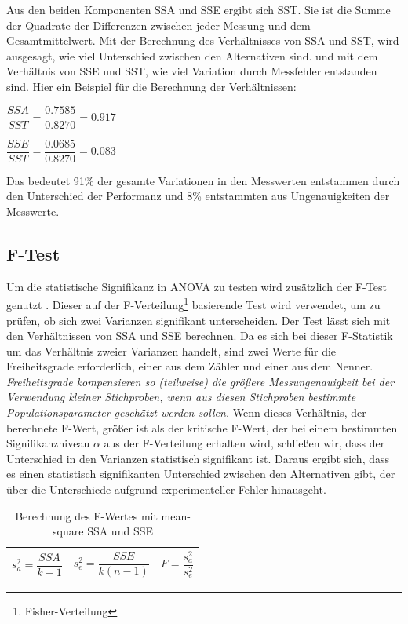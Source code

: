 Aus den beiden Komponenten SSA und SSE ergibt sich SST.
Sie ist die Summe der Quadrate der Differenzen zwischen jeder Messung und dem Gesamtmittelwert.
Mit der Berechnung des Verhältnisses von SSA und SST, wird ausgesagt, wie viel Unterschied zwischen den Alternativen sind.
und mit dem Verhältnis von SSE und SST, wie viel Variation durch Messfehler entstanden sind.  
Hier ein Beispiel für die Berechnung der Verhältnissen:

\begin{center}
  $\dfrac{SSA}{SST} = \dfrac{0.7585}{0.8270} = 0.917$
\end{center}

\begin{center}
  $\dfrac{SSE}{SST} = \dfrac{0.0685}{0.8270} = 0.083$
\end{center}

Das bedeutet 91\% der gesamte Variationen in den Messwerten entstammen durch den Unterschied der Performanz und
8\% entstammten aus Ungenauigkeiten der Messwerte. 



\subsection{F-Test}
Um die statistische Signifikanz in ANOVA zu testen wird zusätzlich der F-Test genutzt \cite[S. ff 71]{Lilja_2000}.
Dieser auf der F-Verteilung\footnote{Fisher-Verteilung} basierende Test wird verwendet, um zu prüfen, ob sich zwei Varianzen signifikant unterscheiden.
Der Test lässt sich mit den Verhältnissen von SSA und SSE berechnen.
Da es sich bei dieser F-Statistik um das Verhältnis zweier Varianzen handelt, sind zwei Werte für die Freiheitsgrade erforderlich, 
einer aus dem Zähler und einer aus dem Nenner.
\textit{Freiheitsgrade kompensieren so (teilweise)
die größere Messungenauigkeit bei der Verwendung kleiner Stichproben, wenn aus
diesen Stichproben bestimmte Populationsparameter geschätzt werden sollen.} \cite[S. 49]{inferenzstatistik}
Wenn dieses Verhältnis, der berechnete F-Wert, größer ist als der kritische F-Wert, der bei einem bestimmten Signifikanzniveau $\alpha$ aus der F-Verteilung erhalten wird, 
schließen wir, dass der Unterschied in den Varianzen statistisch signifikant ist. Daraus ergibt sich, 
dass es einen statistisch signifikanten Unterschied zwischen den Alternativen gibt, der über die Unterschiede aufgrund experimenteller Fehler hinausgeht.

\begin{center}
  \begin{table}[h!]
    \begin{tabularx}{\textwidth}{|X|X|X|}
      \hline
       $s^2_a = \dfrac{SSA}{k - 1}$ & $s^2_e = \dfrac{SSE}{k(n-1)}$ & $F = \dfrac{s^2_a}{s^2_e}$\\ 
      \hline
    \end{tabularx}
    \caption{Berechnung des F-Wertes mit mean-square SSA und SSE}
    \label{tab:f_computing}
  \end{table}
\end{center}

